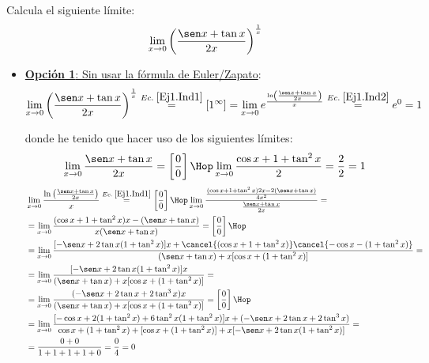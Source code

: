 \documentclass[12pt]{article}
\begin{document}
    \begin{ejercicio}
    Calcula el siguiente límite:
    \begin{equation*}
        \lim_{x\to 0}\left(\frac{\sen x +\tan x}{2x}\right) ^\frac{1}{x}
    \end{equation*}
    
    \begin{itemize}
        \item \underline{\textbf{Opción 1}: Sin usar la fórmula de Euler/Zapato}:
        \begin{equation*}
            \lim_{x\to 0}\left(\frac{\sen x +\tan x}{2x}\right) ^\frac{1}{x} \stackrel{Ec.\;\ref{Ej1.Ind1}}{=} [1^\infty] = \lim_{x\to 0}e^{\frac{\ln\left(\frac{\sen x +\tan x}{2x}\right)}{x}}
            \stackrel{Ec.\;\ref{Ej1.Ind2}}{=} e^0 = 1
        \end{equation*}
    
        donde he tenido que hacer uso de los siguientes límites:
        \begin{equation} \label{Ej1.Ind1}
            \lim_{x\to 0} \frac{\sen x +\tan x}{2x} = \left[\frac{0}{0}\right] \Hop \lim_{x\to 0} \frac{\cos x + 1+\tan^2 x}{2} = \frac{2}{2} = 1
        \end{equation}
        \begin{equation}\begin{split} \label{Ej1.Ind2}
            &\lim_{x\to 0}\frac{\ln\left(\frac{\sen x +\tan x}{2x}\right)}{x} \stackrel{Ec.\;\ref{Ej1.Ind1}}{=} \left[\frac{0}{0}\right] \Hop
            \lim_{x\to 0} \frac{\frac{(\cos x +1+\tan^2 x)2x -2(\sen x + \tan x)}{4x^2}}{\frac{\sen x +\tan x}{2x}} 
            =\\&=
            \lim_{x\to 0} \frac{(\cos x +1+\tan^2 x)x -(\sen x + \tan x)}{x(\sen x +\tan x)}
            = \left[\frac{0}{0}\right]
            \Hop\\&=
            \lim_{x\to 0} \frac{[-\sen x +2\tan x(1+\tan^2x)]x + \cancel{(\cos x + 1 + \tan^2 x)}\cancel{-\cos x -(1+\tan^2x)} }{(\sen x + \tan x) +x[\cos x +(1+\tan^2 x)]}
            =\\&=
            \lim_{x\to 0} \frac{[-\sen x +2\tan x(1+\tan^2x)]x}{(\sen x + \tan x) +x[\cos x +(1+\tan^2 x)]}
            =\\&=
            \lim_{x\to 0} \frac{(-\sen x +2\tan x +2\tan^3x)x}{(\sen x + \tan x) +x[\cos x +(1+\tan^2 x)]}
            = \left[\frac{0}{0}\right]
            \Hop\\&=
            \lim_{x\to 0} \frac{[-\cos x +2(1+\tan^2 x) +6\tan^2x (1+\tan^2 x)]x +(-\sen x +2\tan x +2\tan^3x)}{\cos x+(1+\tan^2 x)+[\cos x +(1+\tan^2 x)] +x[-\sen x +2\tan x(1+\tan^2 x)]}
            =\\&=
            \frac{0+0}{1+1+1+1+0} = \frac{0}{4} = 0
        \end{split}\end{equation}


\end{itemize}
\end{ejercicio}
\end{document}
